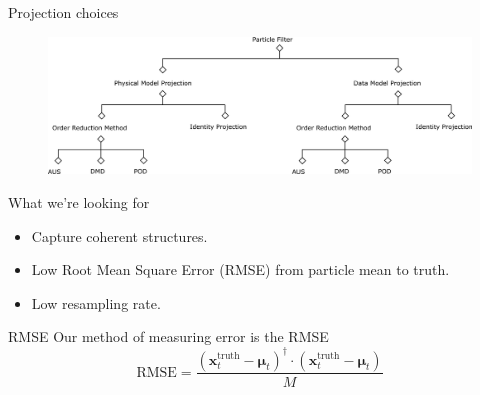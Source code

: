 \documentclass[aspectratio=169]{beamer}
\newcommand{\state}{\boldsymbol{x}}
\begin{document}
\begin{frame}{Projection choices}
\vfill
    \begin{figure}[H]
        \centering
        \includegraphics[width=\textwidth]{figures/decision_tree.png}
    \end{figure}
\vfill
\end{frame}


\begin{frame}{What we're looking for}
\vfill
    \begin{itemize}
    \pause
        \item Capture coherent structures.
    \pause
        \item Low Root Mean Square Error (RMSE) from particle mean to truth.
    \pause
        \item Low resampling rate.
    \end{itemize}
\vfill
\end{frame}


\begin{frame}{RMSE}
\vfill
Our method of measuring error is the RMSE
\[
\textrm{RMSE} = \frac{(\state_t^{\textrm{truth}}-\boldsymbol{\mu}_t)^\dagger \cdot (\state_t^{\textrm{truth}}-\boldsymbol{\mu}_t)}{M}
\]
\vfill
\end{frame}



\end{document}

